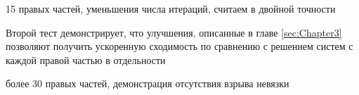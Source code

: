 \par 15 правых частей, уменьшения числа итераций, считаем в двойной точности
\par Второй тест демонстрирует, что улучшения, описанные в главе \ref{sec:Chapter3} позволяют получить ускоренную сходимость
по сравнению с решением систем с каждой правой частью в отдельности
\par более 30 правых частей, демонстрация отсутствия взрыва невязки

\newpage
